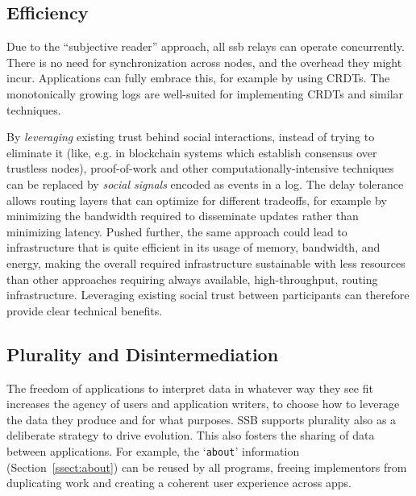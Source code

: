 \documentclass[9pt,sigconf,rewiew]{acmart}
\begin{document}



\subsection{Efficiency}

Due to the ``subjective reader'' approach, all ssb relays can operate concurrently. There is no need for synchronization across nodes, and the overhead they might incur. Applications can fully embrace this, for example by using CRDTs. The monotonically growing logs are well-suited for implementing CRDTs and similar techniques.

By {\em leveraging} existing trust behind social interactions, instead of trying to eliminate it (like, e.g. in blockchain systems which establish consensus over trustless nodes), proof-of-work and other computationally-intensive techniques can be replaced by \textit{social signals} encoded as events in a log. The delay tolerance allows routing layers that can optimize for different tradeoffs, for example by minimizing the bandwidth required to disseminate updates rather than minimizing latency. Pushed further, the same approach could lead to infrastructure that is quite efficient in its usage of memory, bandwidth, and energy, making the overall required infrastructure sustainable with less resources than other approaches requiring always available, high-throughput, routing infrastructure. Leveraging existing social trust between participants can therefore provide clear technical benefits.

\subsection{Plurality and Disintermediation}


The freedom of applications to interpret data in whatever way they see fit increases the agency of users and application writers, to choose how to leverage the data they produce and for what purposes. SSB supports plurality also as a deliberate strategy to drive evolution. This also fosters the sharing of data between applications. For example, the `{\small\tt about}' information (Section~\ref{ssect:about}) can be reused by all programs, freeing implementors from duplicating work and creating a coherent user experience across apps.
\end{document}
